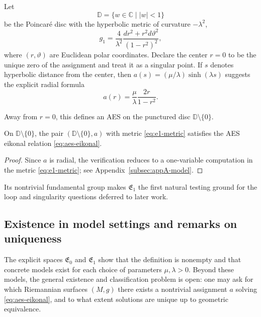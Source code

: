 Let
\[
\mathbb{D}=\{w\in\mathbb{C}\mid |w|<1\}
\]
be the Poincaré disc with the hyperbolic metric of curvature $-\lambda^2$,
\begin{equation}\label{eq:e1-metric}
g_1=\frac{4}{\lambda^2}\frac{dr^2+r^2 d\vartheta^2}{(1-r^2)^2},
\end{equation}
where $(r,\vartheta)$ are Euclidean polar coordinates. Declare the center $r=0$ to be the unique zero of the assignment and treat it as a singular point. If $s$ denotes hyperbolic distance from the center, then $a(s)=(\mu/\lambda)\sinh(\lambda s)$ suggests the explicit radial formula
\begin{equation}\label{eq:e1-assignment}
a(r)=\frac{\mu}{\lambda}\frac{2r}{1-r^2}.
\end{equation}

Away from $r=0$, this defines an AES on the punctured disc $\mathbb{D}\setminus\{0\}$.

\begin{lemma}\label{lemma:aes-e1}
On $\mathbb{D}\setminus\{0\}$, the pair $(\mathbb{D}\setminus\{0\},a)$ with metric \eqref{eq:e1-metric} satisfies the AES eikonal relation \eqref{eq:aes-eikonal}.
\end{lemma}

\begin{proof}
Since $a$ is radial, the verification reduces to a one-variable computation in the metric \eqref{eq:e1-metric}; see Appendix~\ref{subsec:appA-model}.
\end{proof}

Its nontrivial fundamental group makes $\mathfrak{E}_1$ the first natural testing ground for the loop and singularity questions deferred to later work.

\subsection{Existence in model settings and remarks on uniqueness}\label{subsec:aes-existence}

The explicit spaces $\mathfrak{E}_0$ and $\mathfrak{E}_1$ show that the definition is nonempty and that concrete models exist for each choice of parameters $\mu,\lambda>0$. Beyond these models, the general existence and classification problem is open: one may ask for which Riemannian surfaces $(M,g)$ there exists a nontrivial assignment $a$ solving \eqref{eq:aes-eikonal}, and to what extent solutions are unique up to geometric equivalence.

